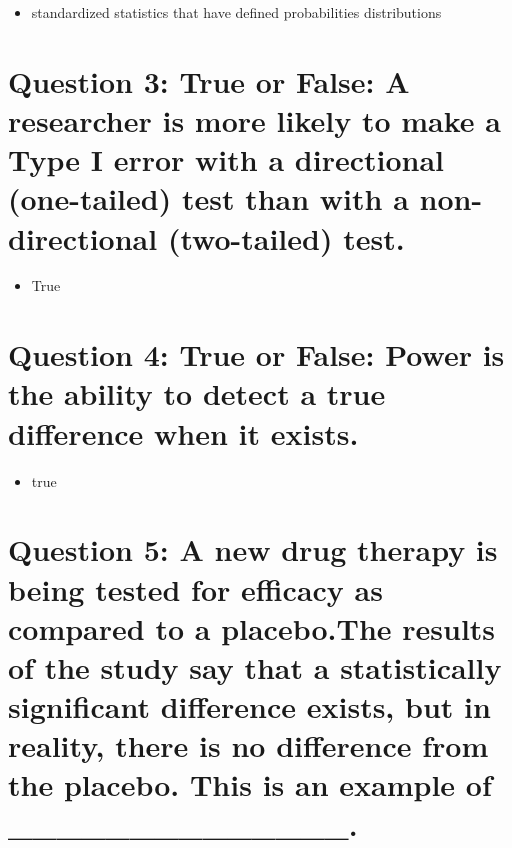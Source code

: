 \documentclass[
]{article}
\providecommand{\tightlist}{%
  \setlength{\itemsep}{0pt}\setlength{\parskip}{0pt}}
\begin{document}
\begin{itemize}
\tightlist
\item
  standardized statistics that have defined probabilities distributions
\end{itemize}

\hypertarget{question-3-true-or-false-a-researcher-is-more-likely-to-make-a-type-i-error-with-a-directional-one-tailed-test-than-with-a-non-directional-two-tailed-test.}{%
\section{Question 3: True or False: A researcher is more likely to make
a Type I error with a directional (one-tailed) test than with a
non-directional (two-tailed)
test.}\label{question-3-true-or-false-a-researcher-is-more-likely-to-make-a-type-i-error-with-a-directional-one-tailed-test-than-with-a-non-directional-two-tailed-test.}}

\begin{itemize}
\tightlist
\item
  True
\end{itemize}

\hypertarget{question-4-true-or-false-power-is-the-ability-to-detect-a-true-difference-when-it-exists.}{%
\section{Question 4: True or False: Power is the ability to detect a
true difference when it
exists.}\label{question-4-true-or-false-power-is-the-ability-to-detect-a-true-difference-when-it-exists.}}

\begin{itemize}
\tightlist
\item
  true
\end{itemize}

\hypertarget{question-5-a-new-drug-therapy-is-being-tested-for-efficacy-as-compared-to-a-placebo.the-results-of-the-study-say-that-a-statistically-significant-difference-exists-but-in-reality-there-is-no-difference-from-the-placebo.-this-is-an-example-of-______________.}{%
\section{Question 5: A new drug therapy is being tested for efficacy as
compared to a placebo.The results of the study say that a statistically
significant difference exists, but in reality, there is no difference
from the placebo. This is an example of
\_\_\_\_\_\_\_\_\_\_\_\_\_\_.}\label{question-5-a-new-drug-therapy-is-being-tested-for-efficacy-as-compared-to-a-placebo.the-results-of-the-study-say-that-a-statistically-significant-difference-exists-but-in-reality-there-is-no-difference-from-the-placebo.-this-is-an-example-of-______________.}}
\end{document}
